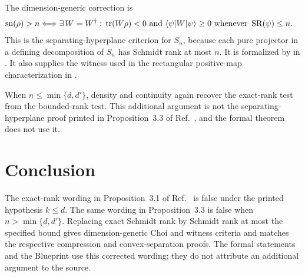 \documentclass{article}
\begin{document}
The dimension-generic correction is
\begin{align}
    \operatorname{sn}(\rho)>n
        &\Longleftrightarrow
          \exists\,W=W^\dagger:\,
          \operatorname{tr}(W\rho)<0
          \text{ and }
          \langle \psi|W|\psi\rangle\geq0
          \text{ whenever }\operatorname{SR}(\psi)\leq n.
    \label{eq:wolf_prop3_1_exact_schmidt_rank_scope_corrected_witness_criterion}
\end{align}
This is the separating-hyperplane criterion for $S_n$, because each pure
projector in a defining decomposition of $S_n$ has Schmidt rank at most $n$.
It is formalized by
 in
. It also supplies the witness
used in the rectangular positive-map characterization
in .

When $n\leq\min\{d,d'\}$, density and continuity again recover the exact-rank
test from the bounded-rank test. This additional argument is not the
separating-hyperplane proof printed in Proposition~3.3 of
Ref.~\cite{Wolf2012Quantum}, and the formal theorem does not use it.

\section{Conclusion}

The exact-rank wording in Proposition~3.1 of
Ref.~\cite{Wolf2012Quantum} is false under the printed hypothesis $k\leq d$.
The same wording in Proposition~3.3 is false when
$n>\min\{d,d'\}$. Replacing exact Schmidt rank by Schmidt rank at most the
specified bound gives dimension-generic Choi and witness criteria and matches
the respective compression and convex-separation proofs. The formal
statements and the Blueprint use this corrected wording; they do not attribute
an additional argument to the source.



\end{document}
